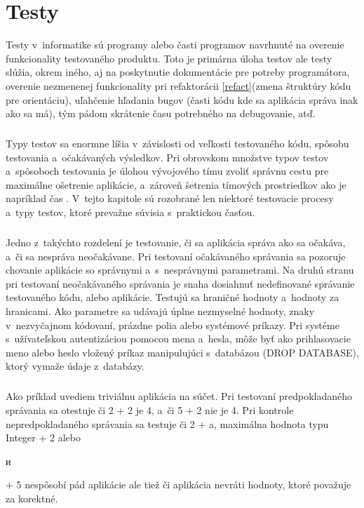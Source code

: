 \documentclass[
  digital, %
  table,   %
oneside,
  nolof,     %
  nolot,     %
]{fithesis3}
\begin{document}
\chapter{Testy}
Testy v~informatike sú programy alebo časti programov navrhnuté na overenie funkcionality testovaného produktu. Toto je primárna úloha testov ale testy slúžia, okrem iného, aj na poskytnutie dokumentácie pre potreby programátora, overenie nezmenenej funkcionality pri refaktorácii \ref{refact}(zmena štruktúry kódu pre orientáciu), uľahčenie hľadania bugov (časti kódu kde sa aplikácia správa inak ako sa má), tým pádom skrátenie času potrebného na debugovanie, atď.
 \paragraph{}
Typy testov sa enormne líšia v~závislosti od veľkosti testovaného kódu, spôsobu testovania a~očakávaných výsledkov. Pri obrovskom množstve typov testov a~spôsoboch testovania je úlohou vývojového tímu zvoliť správnu cestu pre maximálne ošetrenie aplikácie, a~zároveň šetrenia tímových prostriedkov ako je napríklad čas \cite{ssl}. V~tejto kapitole sú rozobrané len niektoré testovacie procesy a~typy testov, ktoré prevažne súvisia s~praktickou časťou.\paragraph{}
Jedno z~takýchto rozdelení je  testovanie, či sa aplikácia správa ako sa očakáva, a~či sa nespráva neočakávane. Pri testovaní očakávaného správania sa pozoruje chovanie aplikácie so správnymi a~s~nesprávnymi parametrami. Na druhú stranu pri testovaní neočakávaného správania je snaha dosiahnuť nedefinované správanie  testovaného kódu, alebo aplikácie. Testujú sa hraničné hodnoty a~hodnoty za hranicami. Ako parametre sa udávajú úplne nezmyselné hodnoty, znaky v~nezvyčajnom kódovaní, prázdne polia alebo systémové príkazy. Pri systéme s~užívateľskou  autentizáciou pomocou mena a~hesla, môže byť ako prihlasovacie meno alebo heslo vložený príkaz manipulujúci s~databázou (DROP DATABASE), ktorý vymaže údaje z~databázy. \paragraph{}
Ako príklad uvediem triviálnu aplikácia na súčet. Pri testovaní predpokladaného správania sa otestuje či 2 + 2 je 4, a~či 5 + 2 nie je 4. Pri kontrole nepredpokladaného správania sa testuje či 2 + a, maximálna hodnota typu Integer + 2 alebo \begin{otherlanguage}{russian} и \end{otherlanguage}  + 5 nespôsobí pád aplikácie ale tiež či aplikácia nevráti hodnoty, ktoré považuje za korektné. \paragraph{}
\end{document}
